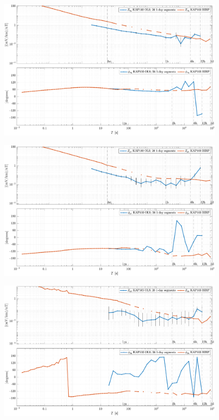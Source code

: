 \documentclass{article}
\begin{document}
\clearpage

\begin{figure}[h!]
\centering
\includegraphics[width=\textwidth]{figures/KAP103/transferfnZ_compare-Z_xy_Magnitude_Phase.pdf}
\caption{}
\label{fig:universe}
\end{figure}

\begin{figure}[h!]
\centering
\includegraphics[width=\textwidth]{figures/KAP103/transferfnZ_compare-Z_yx_Magnitude_Phase.pdf}
\caption{}
\label{fig:universe}
\end{figure}

\begin{figure}[h!]
\centering
\includegraphics[width=\textwidth]{figures/KAP103/transferfnZ_compare-Z_yy_Magnitude_Phase.pdf}
\caption{}
\label{fig:universe}
\end{figure}
\end{document}
